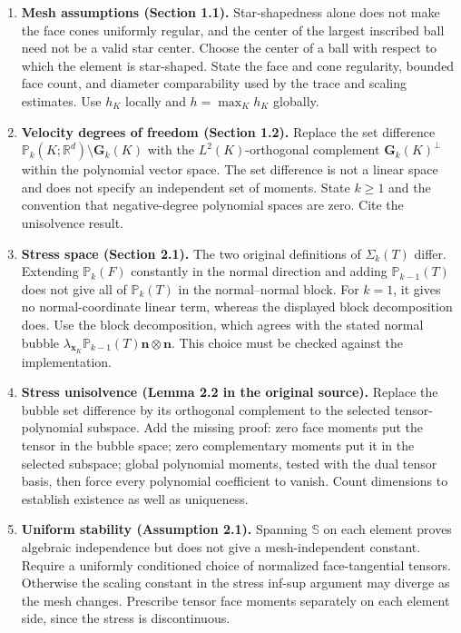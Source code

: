 \documentclass[10pt]{article}
\begin{document}
\begin{enumerate}
\item \textbf{Mesh assumptions (Section 1.1).}
Star-shapedness alone does not make the face cones uniformly regular, and the
center of the largest inscribed ball need not be a valid star center. Choose the
center of a ball with respect to which the element is star-shaped. State the face
and cone regularity, bounded face count, and diameter comparability used by the
trace and scaling estimates. Use $h_K$ locally and $h=\max_K h_K$ globally.

\item \textbf{Velocity degrees of freedom (Section 1.2).}
Replace the set difference $\mathbb P_k(K;\mathbb R^d)\setminus\mathbf G_k(K)$
with the $L^2(K)$-orthogonal complement $\mathbf G_k(K)^\perp$ within the
polynomial vector space. The set difference is not a linear space and does not
specify an independent set of moments. State $k\geq1$ and the convention that
negative-degree polynomial spaces are zero. Cite the unisolvence result.

\item \textbf{Stress space (Section 2.1).}
The two original definitions of $\Sigma_k(T)$ differ. Extending $\mathbb P_k(F)$
constantly in the normal direction and adding $\mathbb P_{k-1}(T)$ does not give
all of $\mathbb P_k(T)$ in the normal--normal block. For $k=1$, it gives no
normal-coordinate linear term, whereas the displayed block decomposition does.
Use the block decomposition, which agrees with the stated normal bubble
$\lambda_{\boldsymbol x_K}\mathbb P_{k-1}(T)\boldsymbol n\otimes\boldsymbol n$.
This choice must be checked against the implementation.

\item \textbf{Stress unisolvence (Lemma 2.2 in the original source).}
Replace the bubble set difference by its orthogonal complement to the selected
tensor-polynomial subspace. Add the missing proof: zero face moments put the
tensor in the bubble space; zero complementary moments put it in the selected
subspace; global polynomial moments, tested with the dual tensor basis, then
force every polynomial coefficient to vanish. Count dimensions to establish
existence as well as uniqueness.

\item \textbf{Uniform stability (Assumption 2.1).}
Spanning $\mathbb S$ on each element proves algebraic independence but does not
give a mesh-independent constant. Require a uniformly conditioned choice of
normalized face-tangential tensors. Otherwise the scaling constant in the
stress inf-sup argument may diverge as the mesh changes. Prescribe tensor face
moments separately on each element side, since the stress is discontinuous.


\end{enumerate}
\end{document}
